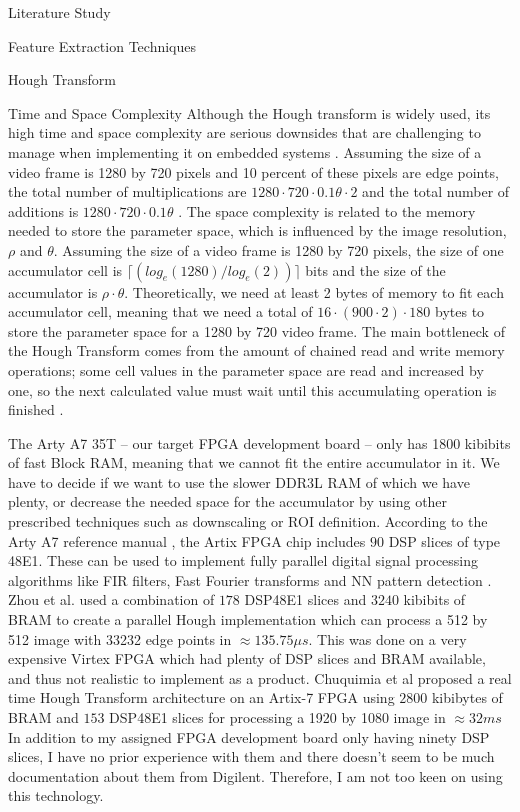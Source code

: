 \documentclass{matthijs}
\begin{document}
\begin{hoofdstuk}{Literature Study}
\begin{paragraaf}{Feature Extraction Techniques}
\begin{subparagraaf}{Hough Transform}
				\begin{subsubparagraaf}{Time and Space Complexity}
					Although the Hough transform is widely used, its high time and space complexity are serious downsides that are challenging to manage when implementing it on embedded systems \cite{dongkyun2008real}.
					Assuming the size of a video frame is 1280 by 720 pixels and 10 percent of these pixels are edge points, the total number of multiplications are $1280 \cdot 720 \cdot 0.1\theta \cdot 2 $ and the total number of additions is $1280 \cdot 720 \cdot 0.1\theta$ \cite{dongkyun2008real}.
					The space complexity is related to the memory needed to store the parameter space, which is influenced by the image resolution, $\rho$ and $\theta$.
					Assuming the size of a video frame is 1280 by 720 pixels, the size of one accumulator cell is $\lceil (log_e(1280)/log_e(2)) \rceil$ bits and the size of the accumulator is $\rho \cdot \theta$.
					Theoretically, we need at least 2 bytes of memory to fit each accumulator cell, meaning that we need a total of $16 \cdot(900 \cdot 2) \cdot 180$ bytes to store the parameter space for a 1280 by 720 video frame.
					The main bottleneck of the Hough Transform comes from the amount of chained read and write memory operations; some cell values in the parameter space are read and increased by one, so the next calculated value must wait until this accumulating operation is finished \cite{dongkyun2008real}.
					
					\bigskip

					The Arty A7 35T -- our target FPGA development board -- only has 1800 kibibits \cite{digilent2020arty} of fast Block RAM, meaning that we cannot fit the entire accumulator in it.
					We have to decide if we want to use the slower DDR3L RAM of which we have plenty, or decrease the needed space for the accumulator by using other prescribed techniques such as downscaling or ROI definition.
					According to the Arty A7 reference manual \cite{digilent2020arty}, the Artix FPGA chip includes $90$ DSP slices of type 48E1.
					These can be used to implement fully parallel digital signal processing algorithms like FIR filters, Fast Fourier transforms and NN pattern detection \cite{xilinx2018series}.
					Zhou et al. \cite{zhou2013efficient} used a combination of $178$ DSP48E1 slices and $3240$ kibibits of BRAM to create a parallel Hough implementation which can process a 512 by 512 image with 33232 edge points in $\approx 135.75 \mu s$.
					This was done on a very expensive Virtex FPGA which had plenty of DSP slices and BRAM available, and thus not realistic to implement as a product.
					Chuquimia et al \cite{chuquimia2018fpga} proposed a real time Hough Transform architecture on an Artix-7 FPGA using $2800$ kibibytes of BRAM and $153$ DSP48E1 slices for processing a 1920 by 1080 image in $\approx 32 ms$
					In addition to my assigned FPGA development board only having ninety DSP slices, I have no prior experience with them and there doesn't seem to be much documentation about them from Digilent.
					Therefore, I am not too keen on using this technology.


\end{subsubparagraaf}
\end{subparagraaf}
\end{paragraaf}
\end{hoofdstuk}
\end{document}
